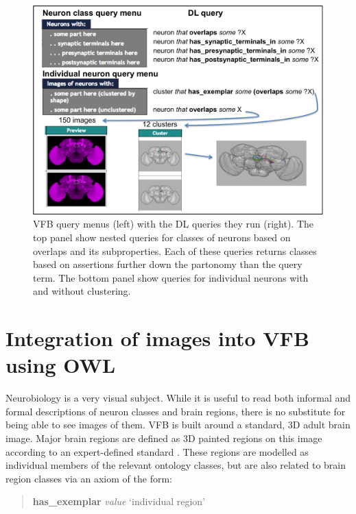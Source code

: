 \documentclass[runningheads,a4paper]{llncs}
\begin{document}

\begin{figure}
\centering
\includegraphics[width=120mm]{images/Query_menus_DL_images.png}
\caption{VFB query menus (left) with the DL queries they run (right).  The top panel
  show nested queries for classes of neurons based on overlaps and its
  subproperties.  Each of these queries returns classes based on
  assertions further down the partonomy than the query term.  The
  bottom panel show queries for individual neurons with and without clustering. }
\label{fig:Query_menus_DL_images}
\end{figure}

\section{Integration of images into VFB using OWL}

Neurobiology is a very visual subject.  While it is useful to read
both informal and formal descriptions of neuron classes and brain
regions, there is no substitute for being able to see images of them.
VFB is built around a standard, 3D adult brain image.  Major brain
regions are defined as 3D painted regions on this image according to
an expert-defined standard \cite{pmid24559671}.  These regions are modelled as
individual members of the relevant ontology classes, but are also
related to brain region classes via an axiom of the form:

\begin{quote}
\textbf{has\_exemplar} \textit{value} `individual region'
\end{quote}
\end{document}
